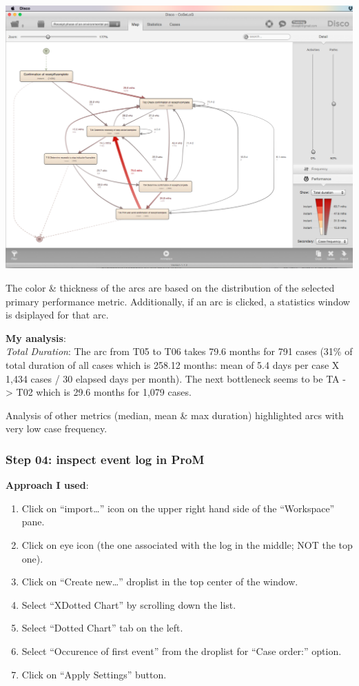 \documentclass[]{article}
\begin{document}
\includegraphics{CoSeLoG_Step_03.png}

The color \& thickness of the arcs are based on the distribution of the
selected primary performance metric. Additionally, if an arc is clicked,
a statistics window is dsiplayed for that arc.

\textbf{My analysis}:\\\emph{Total Duration}: The arc from T05 to T06
takes 79.6 months for 791 cases (31\% of total duration of all cases
which is 258.12 months: mean of 5.4 days per case X 1,434 cases / 30
elapsed days per month). The next bottleneck seems to be TA
-\textgreater{} T02 which is 29.6 months for 1,079 cases.

Analysis of other metrics (median, mean \& max duration) highlighted
arcs with very low case frequency.

\subsubsection{Step 04: inspect event log in
ProM}\label{step-04-inspect-event-log-in-prom}

\textbf{Approach I used}:

\begin{enumerate}
\def\labelenumi{\arabic{enumi}.}
\itemsep1pt\parskip0pt
\item
  Click on ``import\ldots{}'' icon on the upper right hand side of the
  ``Workspace'' pane.\\
\item
  Click on eye icon (the one associated with the log in the middle; NOT
  the top one).\\
\item
  Click on ``Create new\ldots{}'' droplist in the top center of the
  window.\\
\item
  Select ``XDotted Chart'' by scrolling down the list.
\item
  Select ``Dotted Chart'' tab on the left.
\item
  Select ``Occurence of first event'' from the droplist for ``Case
  order:'' option.\\
\item
  Click on ``Apply Settings'' button.
\end{enumerate}
\end{document}
